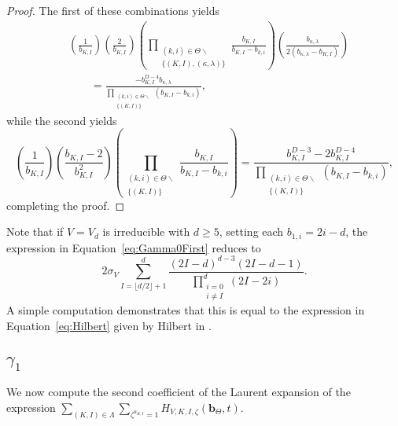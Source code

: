 \documentclass{amsart}
\theoremstyle{definition}
\theoremstyle{remark}
\newcommand{\bs}{\boldsymbol}
\begin{document}
\begin{proof}
The first of these combinations yields
\begin{align*}
    &\left( \frac{1}{b_{K,I}} \right)
    \left( \frac{2}{b_{K,I}} \right)
    \left( \prod\limits_{\substack{(k,i)\in\Theta\smallsetminus \\ \{(K,I), (\kappa,\lambda)\} }}
            \frac{b_{K,I}}{b_{K,I} - b_{k,i}} \right)
    \left( \frac{b_{\kappa,\lambda}}{2(b_{\kappa,\lambda} - b_{K,I})} \right)
    \\&\quad\quad=
    \frac{-b_{K,I}^{D-4} b_{\kappa,\lambda}}
        {\prod\limits_{\substack{(k,i)\in\Theta\smallsetminus \\ \{(K,I)\}}} (b_{K,I} - b_{k,i})},
\end{align*}
while the second yields
\[
    \left( \frac{1}{b_{K,I}} \right)
    \left( \frac{b_{K,I} - 2}{b_{K,I}^2} \right)
    \left( \prod\limits_{\substack{(k,i)\in\Theta\smallsetminus \\ \{(K,I)\}}}
            \frac{b_{K,I}}{b_{K,I} - b_{k,i}} \right)
    =
    \frac{b_{K,I}^{D-3} - 2 b_{K,I}^{D-4}}
        {\prod\limits_{\substack{(k,i)\in\Theta\smallsetminus \\ \{(K,I)\}}}
            (b_{K,I} - b_{k,i}) },
\]
completing the proof.
\end{proof}

Note that if $V = V_d$ is irreducible with $d \geq 5$, setting each $b_{1,i} = 2i - d$,
the expression in Equation~\eqref{eq:Gamma0First} reduces to
\[
    2\sigma_V \sum\limits_{I = \lfloor d/2\rfloor + 1}^d
        \frac{(2I - d)^{d-3} (2I - d - 1)}
            {\prod\limits_{\substack{i = 0 \\ i\neq I}}^d (2I - 2i)}.
\]
A simple computation demonstrates that this is equal to the expression in
Equation~\eqref{eq:Hilbert} given by Hilbert in \cite{Hilbert}.



\subsection{$\gamma_1$}
\label{subsec:LaurentGamma1First}


We now compute the second coefficient of the Laurent expansion of the expression
$\sum_{(K,I)\in\Lambda} \sum_{\zeta^{a_{K,I}} = 1} H_{V,K,I,\zeta}(\bs{b}_\Theta,t)$.
\end{document}
